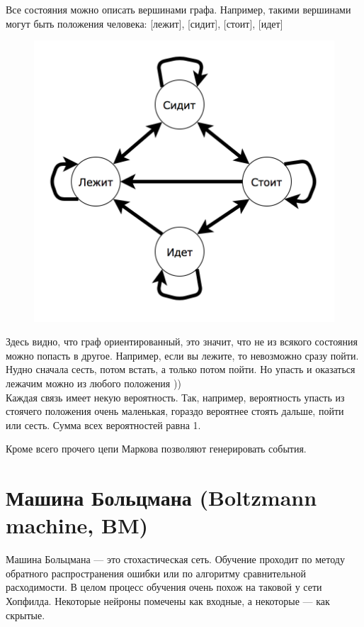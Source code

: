 \documentclass[paper=a4, fontsize=11pt]{scrartcl} %
\numberwithin{equation}{section} %
\numberwithin{figure}{section} %
\numberwithin{table}{section} %
\begin{document}
	Все состояния можно описать вершинами графа. Например, такими вершинами могут быть положения человека: [лежит], [сидит], [стоит], [идет]
	
	\begin{figure}[h!]
		\centering
		\includegraphics[scale=0.25]{graph}
	\end{figure}
	
	Здесь видно, что граф ориентированный, это значит, что не из всякого состояния можно попасть в другое. Например, если вы лежите, то невозможно сразу пойти. Нудно сначала сесть, потом встать, а только потом пойти. Но упасть и оказаться лежачим можно из любого положения ))  \\
	Каждая связь имеет некую вероятность. Так, например, вероятность упасть из стоячего положения очень маленькая, гораздо вероятнее стоять дальше, пойти или сесть. Сумма всех вероятностей равна 1.
	
	Кроме всего прочего цепи Маркова позволяют генерировать события. 
	
	\section{Машина Больцмана (Boltzmann machine, BM)}
	Машина Больцмана — это стохастическая сеть. Обучение проходит по методу обратного распространения ошибки или по алгоритму сравнительной расходимости.  В целом процесс обучения очень похож на таковой у сети Хопфилда.
	Некоторые нейроны помечены как входные, а некоторые — как скрытые.
	
\end{document}
